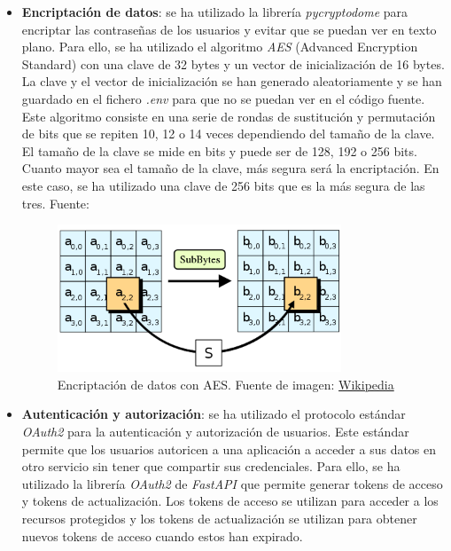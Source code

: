 \begin{itemize}
    \item \textbf{Encriptación de datos}: se ha utilizado la librería \textit{pycryptodome} para encriptar las contraseñas de los
    usuarios y evitar que se puedan ver en texto plano. Para ello, se ha utilizado el algoritmo \textit{AES} (Advanced Encryption Standard) con una clave
    de 32 bytes y un vector de inicialización de 16 bytes. La clave y el vector de inicialización se han generado
    aleatoriamente y se han guardado en el fichero \textit{.env} para que no se puedan ver en el código fuente. Este algoritmo
    consiste en una serie de rondas de sustitución y permutación de bits que se repiten 10, 12 o 14 veces dependiendo
    del tamaño de la clave. El tamaño de la clave se mide en bits y puede ser de 128, 192 o 256 bits. Cuanto mayor sea
    el tamaño de la clave, más segura será la encriptación. En este caso, se ha utilizado una clave de 256 bits que
    es la más segura de las tres. Fuente:~\cite{aes}
        \begin{figure}[H]
            \centering
            \includegraphics[width=0.8\textwidth]{imgs/aes.png}
            \caption{Encriptación de datos con AES. Fuente de imagen: \href{https://es.wikipedia.org/wiki/Advanced_Encryption_Standard}{Wikipedia}}
            \label{fig:encriptacion}
        \end{figure}
    \item \textbf{Autenticación y autorización}: se ha utilizado el protocolo estándar \textit{OAuth2} para la autenticación y autorización de usuarios.
    Este estándar permite que los usuarios autoricen a una aplicación a acceder a sus datos en otro servicio sin tener
    que compartir sus credenciales. Para ello, se ha utilizado la librería \textit{OAuth2} de \textit{FastAPI} que permite
    generar tokens de acceso y tokens de actualización. Los tokens de acceso se utilizan para acceder a los recursos
    protegidos y los tokens de actualización se utilizan para obtener nuevos tokens de acceso cuando estos han expirado.

\end{itemize}
